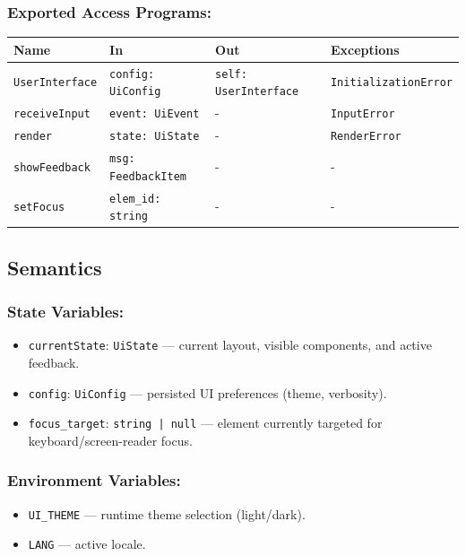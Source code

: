 \documentclass[12pt, titlepage]{article}
\begin{document}
\subsubsection{Exported Access Programs:}

\begin{tabular}{|l|l|l|l|}
\hline
\textbf{Name} & \textbf{In} & \textbf{Out} & \textbf{Exceptions} \\ \hline
\texttt{UserInterface} & \texttt{config: UiConfig} & \texttt{self: UserInterface} & \texttt{InitializationError} \\ 
\texttt{receiveInput} & \texttt{event: UiEvent} & - & \texttt{InputError} \\ 
\texttt{render} & \texttt{state: UiState} & - & \texttt{RenderError} \\ 
\texttt{showFeedback} & \texttt{msg: FeedbackItem} & - & - \\ 
\texttt{setFocus} & \texttt{elem\_id: string} & - & - \\ \hline
\end{tabular}

\subsection{Semantics}

\subsubsection{State Variables:}
\begin{itemize}
  \item \texttt{currentState}: \texttt{UiState} — current layout, visible components, and active feedback.
  \item \texttt{config}: \texttt{UiConfig} — persisted UI preferences (theme, verbosity).
  \item \texttt{focus\_target}: \texttt{string | null} — element currently targeted for keyboard/screen-reader focus.
\end{itemize}

\subsubsection{Environment Variables:}
\begin{itemize}
  \item \texttt{UI\_THEME} — runtime theme selection (light/dark).
  \item \texttt{LANG} — active locale.
\end{itemize}
\end{document}
